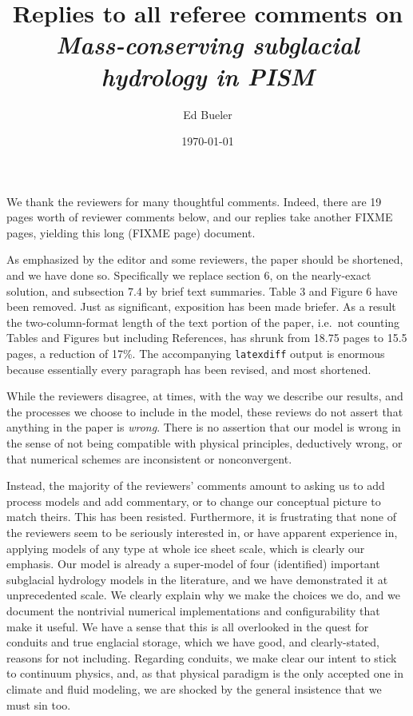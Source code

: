 \documentclass[11pt,reqno]{amsart}
\title[Replies to Referee Comments]{Replies to all referee comments on \\ \emph{Mass-conserving subglacial hydrology in PISM}}
\author{Ed Bueler}
\date{\today}
\begin{document}
\maketitle

\thispagestyle{empty}

We thank the reviewers for many thoughtful comments.  Indeed, there are 19 pages worth of reviewer comments below, and our replies take another FIXME pages, yielding this long (FIXME page) document.

As emphasized by the editor and some reviewers, the paper should be shortened, and we have done so.  Specifically we replace section 6, on the nearly-exact solution, and subsection 7.4 by brief text summaries.  Table 3 and Figure 6 have been removed.  Just as significant, exposition has been made briefer.  As a result the two-column-format length of the text portion of the paper, i.e.~not counting Tables and Figures but including References, has shrunk from 18.75 pages to 15.5 pages, a reduction of 17\%.  The accompanying \texttt{latexdiff} output is enormous because essentially every paragraph has been revised, and most shortened.

While the reviewers disagree, at times, with the way we describe our results, and the processes we choose to include in the model, these reviews do not assert that anything in the paper is \emph{wrong}.  There is no assertion that our model is wrong in the sense of not being compatible with physical principles, deductively wrong, or that numerical schemes are inconsistent or nonconvergent.

Instead, the majority of the reviewers' comments amount to asking us to add process models and add commentary, or to change our conceptual picture to match theirs.  This has been resisted.  Furthermore, it is frustrating that none of the reviewers seem to be seriously interested in, or have apparent experience in, applying models of any type at whole ice sheet scale, which is clearly our emphasis.  Our model is already a super-model of four (identified) important subglacial hydrology models in the literature, and we have demonstrated it at unprecedented scale.  We clearly explain why we make the choices we do, and we document the nontrivial numerical implementations and configurability that make it useful.  We have a sense that this is all overlooked in the quest for conduits and true englacial storage, which we have good, and clearly-stated, reasons for not including.  Regarding conduits, we make clear our intent to stick to continuum physics, and, as that physical paradigm is the only accepted one in climate and fluid modeling, we are shocked by the general insistence that we must sin too.
\end{document}
